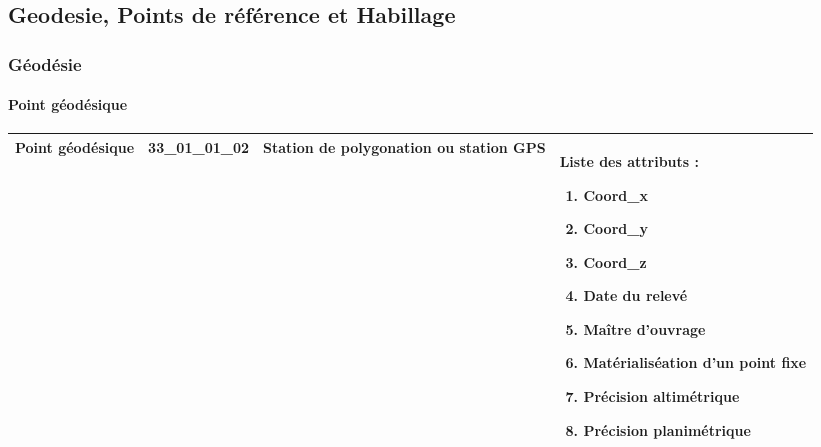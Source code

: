 \documentclass[12pt,titlepage,oneside]{book}
\begin{document}
\subsection{Geodesie, Points de référence et Habillage}
\subsubsection{\large Géodésie}
\paragraph{Point géodésique}
\noindent
\vspace{\baselineskip}

\renewcommand{\arraystretch}{1.2}
\begin{supertabular}{|p{10cm}|c|p{13cm}|p{12cm}|}
 Point géodésique & 33\_01\_01\_02 & Station de polygonation ou station GPS & Liste des attributs :
\begin{enumerate}
  \item Coord\_x  \item Coord\_y  \item Coord\_z  \item Date du relevé  \item Maître d'ouvrage  \item Matérialiséation d'un point fixe  \item Précision altimétrique  \item Précision planimétrique\end{enumerate}
\\
\hline
\end{supertabular}
\end{document}
